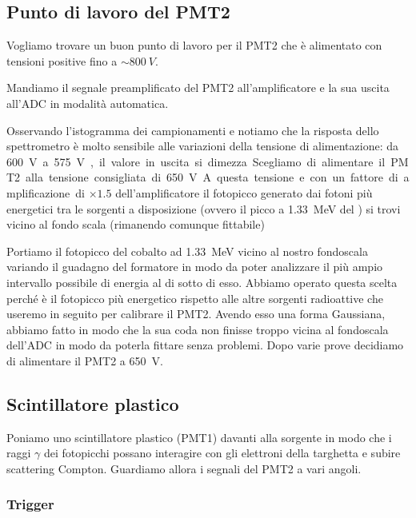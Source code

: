 \subsection{Punto di lavoro del PMT2}

Vogliamo trovare un buon punto di lavoro per il PMT2 che è alimentato con tensioni positive fino a $\sim \SI{800}{V}$. 

Mandiamo il segnale preamplificato del PMT2 all'amplificatore e la sua uscita all'ADC in modalità automatica.

Osservando l'istogramma dei campionamenti e notiamo che la risposta dello spettrometro è molto sensibile alle variazioni della tensione di alimentazione: da \SI{600}V a \SI{575}V, il valore in uscita si dimezza. 

Scegliamo di alimentare il PMT2 alla tensione consigliata di \SI{650}V. A questa tensione e con un fattore di amplificazione di $\times 1.5$ dell'amplificatore il fotopicco generato dai fotoni più energetici tra le sorgenti a disposizione (ovvero il picco a \SI{1.33}{MeV} del \co) si trovi vicino al fondo scala (rimanendo comunque fittabile) 

Portiamo il fotopicco del cobalto ad \SI{1.33}{MeV} vicino al nostro fondoscala variando il guadagno del formatore in modo da poter analizzare il più ampio intervallo possibile di energia al di sotto di esso. Abbiamo operato questa scelta perché è il fotopicco più energetico rispetto alle altre sorgenti radioattive che useremo in seguito per calibrare il PMT2. Avendo esso una forma Gaussiana, abbiamo fatto in modo che la sua coda non finisse troppo vicina al fondoscala dell'ADC in modo da poterla fittare senza problemi. 
Dopo varie prove decidiamo di alimentare il PMT2 a \SI{650}V.


\subsection{Scintillatore plastico}

Poniamo uno scintillatore plastico (PMT1) davanti alla sorgente in modo che i raggi $\gamma$ dei fotopicchi possano interagire con gli elettroni della targhetta e subire scattering Compton. Guardiamo allora i segnali del PMT2 a vari angoli.


\subsubsection{Trigger}


